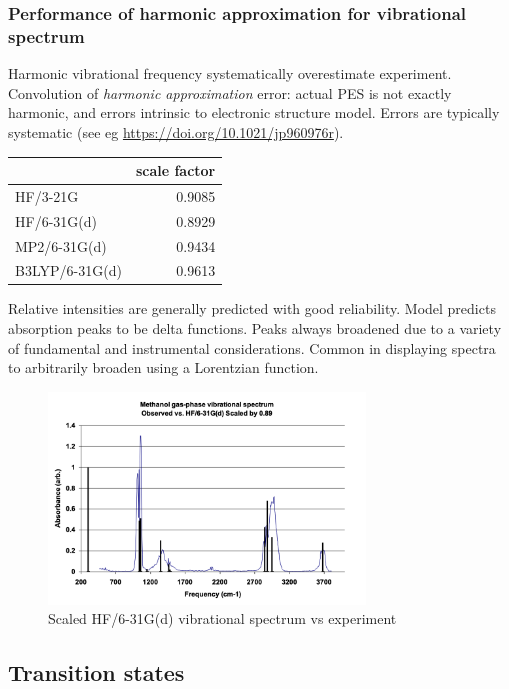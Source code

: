 \documentclass[11pt]{article}
\begin{document}
\subsubsection{Performance of harmonic approximation for vibrational spectrum}
\label{sec:org8b0eb29}
Harmonic vibrational frequency systematically overestimate experiment. Convolution of \emph{harmonic approximation} error: actual PES is not exactly harmonic, and errors intrinsic to electronic structure model.  Errors are typically systematic (see eg \url{https://doi.org/10.1021/jp960976r}).

\begin{center}
\begin{tabular}{lr}
 & scale factor\\
\hline
HF/3-21G & 0.9085\\
HF/6-31G(d) & 0.8929\\
MP2/6-31G(d) & 0.9434\\
B3LYP/6-31G(d) & 0.9613\\
\end{tabular}
\end{center}

Relative intensities are generally predicted with good reliability.  Model predicts absorption peaks to be delta functions.  Peaks always broadened due to a variety of fundamental and instrumental considerations.  Common in displaying spectra to arbitrarily broaden using a Lorentzian function.

\begin{figure}[htbp]
\centering
\includegraphics[width=0.75\textwidth]{./Images/Methanol.png}
\caption{Scaled HF/6-31G(d) vibrational spectrum vs experiment}
\end{figure}
\subsection{Transition states}
\label{sec:orgfc50a83}
\end{document}
